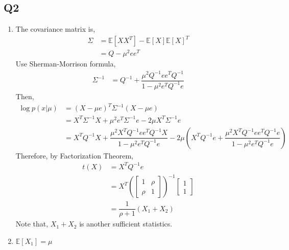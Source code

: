 \documentclass{article}
\begin{document}
\subsection{Q2}
\begin{enumerate}
\item The covariance matrix is,
\begin{align*}
\Sigma &= \mathbb{E}\left[X X^{T}\right] - \mathbb{E}\left[X\right] \mathbb{E}\left[X\right]^{T}
\\ &= Q - \mu^{2} e e^{T}
\end{align*}
Use Sherman-Morrison formula,
\begin{align*}
\Sigma^{-1} &= Q^{-1} + \dfrac{\mu^{2} Q^{-1} e e^{T} Q^{-1}}{1 - \mu^{2} e^{T} Q^{-1} e}
\end{align*}
Then,
\begin{align*}
\log p\left(x | \mu\right) &= \left(X - \mu e\right)^{T} \Sigma^{-1} \left(X - \mu e \right)
\\ &= X^{T} \Sigma^{-1} X + \mu^{2} e^{T} \Sigma^{-1} e - 2 \mu X^{T} \Sigma^{-1} e 
\\ &= X^{T} Q^{-1} X + \dfrac{\mu^{2} X^{T} Q^{-1} e e^{T} Q^{-1} X}{1 - \mu^{2} e^{T} Q^{-1} e} - 2 \mu \left(X^{T} Q^{-1} e + \dfrac{\mu^{2} X^{T} Q^{-1} e e^{T} Q^{-1} e}{1 - \mu^{2} e^{T} Q^{-1} e}\right)
\end{align*}
Therefore, by Factorization Theorem,
\begin{align*}
t\left(X\right)  &= X^{T} Q^{-1} e 
\\ &= X^{T} \left(\begin{bmatrix} 1 & \rho \\ \rho & 1 \end{bmatrix}\right)^{-1} \begin{bmatrix} 1 \\ 1 \end{bmatrix}
\\ &= \dfrac{1}{\rho + 1} \left(X_{1} + X_{2}\right)
\end{align*}
Note that, $X_{1} + X_{2}$ is another sufficient statistics.

\item $\mathbb{E}\left[X_{1}\right] = \mu$
\end{enumerate}
\end{document}
